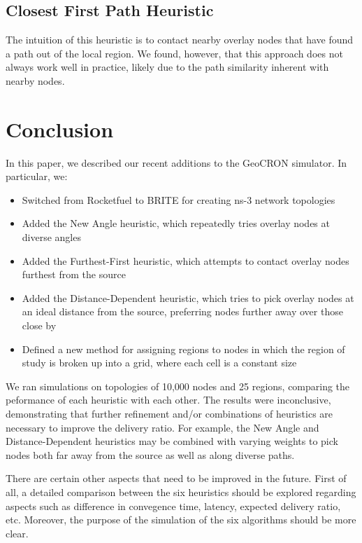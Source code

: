\documentclass[conference]{IEEEtran}
\begin{document}
%
\subsection{Closest First Path Heuristic}
The intuition of this heuristic is to contact nearby overlay nodes that have found a path out of the local region.  We found, however, that this approach does not always work well in practice, likely due to the path similarity inherent with nearby nodes.
\begin{algorithm}
\DontPrintSemicolon
{}
\SetAlgoLined
\SetAlgoLongEnd
\scriptsize
{}
\caption{}
\small
\end{algorithm}

%
\section{Conclusion}
In this paper, we described our recent additions to the GeoCRON simulator.
In particular, we:

\begin{itemize}
 \item Switched from Rocketfuel to BRITE for creating ns-3 network topologies
\item Added the New Angle heuristic, which repeatedly tries overlay nodes at diverse angles
\item Added the Furthest-First heuristic, which attempts to contact overlay nodes furthest from the source
\item Added the Distance-Dependent heuristic, which tries to pick overlay nodes at an ideal distance from the source, preferring nodes further away over those close by
\item Defined a new method for assigning regions to nodes in which the region of study is broken up into a grid, where each cell is a constant size
\end{itemize}

We ran simulations on topologies of 10,000 nodes and 25 regions, comparing the peformance of each heuristic with each other.
The results were inconclusive, demonstrating that further refinement and/or combinations of heuristics are necessary to improve the delivery ratio.
For example, the New Angle and Distance-Dependent heuristics may be combined with varying weights to pick nodes both far away from the source as well as along diverse paths.

There are certain other aspects that need to be improved in the future.
First of all, a detailed comparison between the six heuristics should be explored regarding aspects such as difference in convegence time, latency, expected delivery ratio, etc.
Moreover, the purpose of the simulation of the six algorithms should be more clear.
\end{document}
